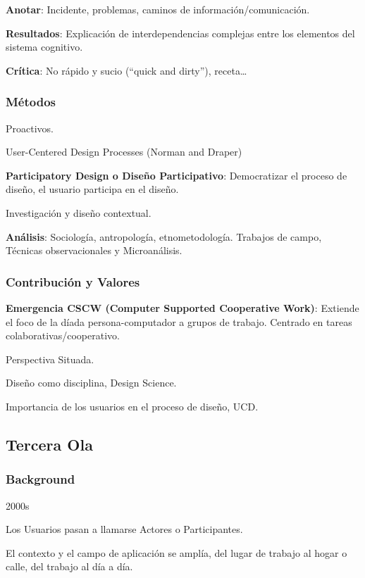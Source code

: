 \documentclass[12pt]{report} %
\begin{document}
\textbf{Anotar}: Incidente, problemas, caminos de
información/comunicación.

\textbf{Resultados}: Explicación de interdependencias complejas entre
los elementos del sistema cognitivo.

\textbf{Crítica}: No rápido y sucio (``quick and dirty''),
receta\ldots{}

\subsubsection{Métodos}

Proactivos.

User-Centered Design Processes (Norman and Draper)

\textbf{Participatory Design o Diseño Participativo}: Democratizar el
proceso de diseño, el usuario participa en el diseño.

Investigación y diseño contextual.

\textbf{Análisis}: Sociología, antropología, etnometodología. Trabajos
de campo, Técnicas observacionales y Microanálisis.

\subsubsection{Contribución y Valores}

\textbf{Emergencia CSCW (Computer Supported Cooperative Work)}: Extiende
el foco de la díada persona-computador a grupos de trabajo. Centrado en
tareas colaborativas/cooperativo.

Perspectiva Situada.

Diseño como disciplina, Design Science.

Importancia de los usuarios en el proceso de diseño, UCD.

\subsection{Tercera Ola}


\subsubsection{Background}

2000s

Los Usuarios pasan a llamarse Actores o Participantes.

El contexto y el campo de aplicación se amplía, del lugar de trabajo al
hogar o calle, del trabajo al día a día.
\end{document}
